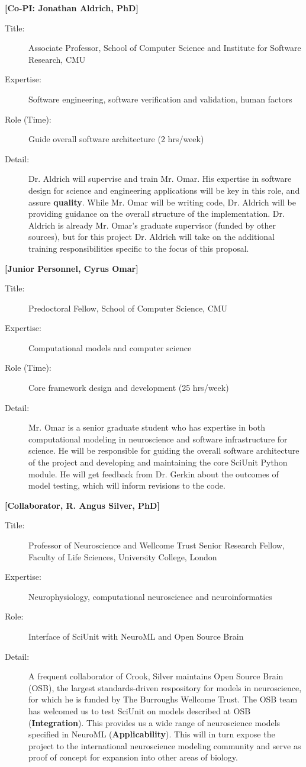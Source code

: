 \documentclass[11pt,letterpaper]{article}
\begin{document}
\textbf{[Co-PI: Jonathan Aldrich, PhD]}
\begin{description}
\item[Title:] Associate Professor, School of Computer Science and Institute for Software Research, CMU
\item[Expertise:] Software engineering, software verification and validation, human factors
\item[Role (Time):] Guide overall software architecture (2 hrs/week)
\item[Detail:] Dr. Aldrich will supervise and train Mr. Omar.  His expertise in software design for science and engineering applications will be key in this role, and assure \textbf{quality}.  While Mr. Omar will be writing code, Dr. Aldrich will be providing guidance on the overall structure of the implementation.  Dr. Aldrich is already Mr. Omar's graduate supervisor (funded by other sources), but for this project Dr. Aldrich will take on the additional training responsibilities specific to the focus of this proposal.  
\end{description}
\textbf{[Junior Personnel, Cyrus Omar]}
\begin{description}
\item[Title:] Predoctoral Fellow, School of Computer Science, CMU
\item[Expertise:] Computational models and computer science 
\item[Role (Time):] Core framework design and development (25 hrs/week)
\item[Detail:] Mr. Omar is a senior graduate student who has expertise in both computational modeling in neuroscience and software infrastructure for science.  He will be responsible for guiding the overall software architecture of the project and developing and maintaining the core SciUnit Python module.  He will get feedback from Dr. Gerkin about the outcomes of model testing, which will inform revisions to the code.  
\end{description}
\textbf{[Collaborator, R. Angus Silver, PhD]}
\begin{description}
\item[Title:] Professor of Neuroscience and Wellcome Trust Senior Research Fellow, Faculty of Life Sciences, University College, London
\item[Expertise:] Neurophysiology, computational neuroscience and neuroinformatics  
\item[Role:] Interface of SciUnit with NeuroML and Open Source Brain
\item[Detail:] A frequent collaborator of Crook, Silver maintains Open Source Brain (OSB), the largest standards-driven respository for models in neuroscience, for which he is funded by The Burroughs Wellcome Trust.  The OSB team has welcomed us to test SciUnit on models described at OSB (\textbf{Integration}).  This provides us a wide range of neuroscience models specified in NeuroML (\textbf{Applicability}).  This will in turn expose the project to the international neuroscience modeling community and serve as proof of concept for expansion into other areas of biology.  
\end{description}
\end{document}
